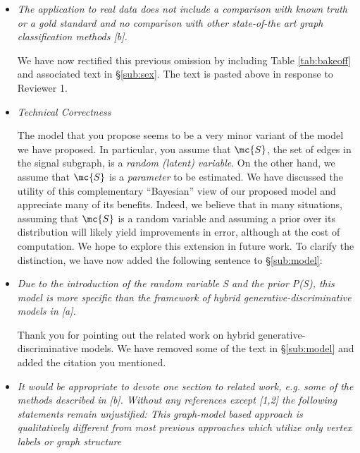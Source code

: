 \begin{itemize}
	\item \emph{The application to real data does not include a comparison with known truth or a gold standard and no comparison with other state-of-the art graph classification methods [b].}
	
	We have now rectified this previous omission by including Table \ref{tab:bakeoff} and associated text in \S \ref{sub:sex}.  The text is pasted above in response to Reviewer 1.


	\item \emph{Technical Correctness}

	The model that you propose seems to be a very minor variant of the model we have proposed.  In particular, you assume that $\mc{S}$, the set of edges in the signal subgraph, is a \emph{random (latent) variable}.  On the other hand, we assume that $\mc{S}$ is a \emph{parameter} to be estimated.  We have discussed the utility of this complementary ``Bayesian'' view of our proposed model and appreciate many of its benefits.  Indeed, we believe that in many situations, assuming that $\mc{S}$ is a random variable and assuming a prior over its distribution will likely yield improvements in error, although at the cost of computation.  We hope to explore this extension in future work.  To clarify the distinction, we have now added the following sentence to \S \ref{sub:model}:
	
	
	\item \emph{Due to the introduction of the random variable S and the prior P(S), this model is more specific than the framework of hybrid generative-discriminative models in [a].}
	
	Thank you for pointing out the related work on hybrid generative-discriminative models.  We have removed some of the text in \S \ref{sub:model} and added the citation you mentioned.
	
	\item \emph{It would be appropriate to devote one section to related work, e.g. some of the methods described in [b]. Without any references except [1,2] the following statements remain unjustified: This graph-model based approach is qualitatively different from most previous approaches which utilize only vertex labels or graph structure}


\end{itemize}
